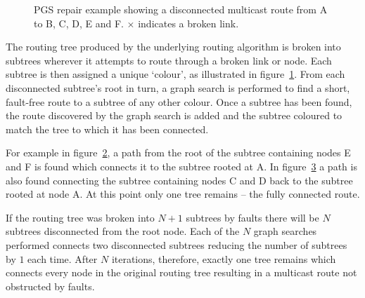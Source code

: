 		\begin{figure}
			\center
			\begin{subfigure}{0.32\linewidth}
				\hspace*{-1.5em}
				
				\caption{}
				\label{fig:pgs-repair-colouring}
			\end{subfigure}
			\begin{subfigure}{0.32\linewidth}
				\hspace*{-1.5em}
				
				\caption{}
				\label{fig:pgs-repair-colouring-fix1}
			\end{subfigure}
			\begin{subfigure}{0.32\linewidth}
				\hspace*{-1.5em}
				
				\caption{}
				\label{fig:pgs-repair-colouring-fix2}
			\end{subfigure}
			
			\caption[PGS repair example.]%
			{PGS repair example showing a disconnected multicast route from A
			to B, C, D, E and F. {\color{red}$\times$} indicates a broken link.}
			\label{fig:pgs-repair-colouring-steps}
		\end{figure}
		
		The routing tree produced by the underlying routing algorithm is broken
		into subtrees wherever it attempts to route through a broken link or node.
		Each subtree is then assigned a unique `colour', as illustrated in
		figure~\ref{fig:pgs-repair-colouring}. From each disconnected subtree's
		root in turn, a graph search is performed to find a short, fault-free route
		to a subtree of any other colour. Once a subtree has been found, the route
		discovered by the graph search is added and the subtree coloured to match
		the tree to which it has been connected.
		
		For example in figure~\ref{fig:pgs-repair-colouring-fix1}, a path from the
		root of the subtree containing nodes E and F is found which connects it to
		the subtree rooted at A. In figure~\ref{fig:pgs-repair-colouring-fix2} a
		path is also found connecting the subtree containing nodes C and D back to
		the subtree rooted at node A. At this point only one tree remains -- the
		fully connected route.
		
		If the routing tree was broken into $N+1$ subtrees by faults there will be
		$N$ subtrees disconnected from the root node. Each of the $N$ graph
		searches performed connects two disconnected subtrees reducing the number
		of subtrees by $1$ each time. After $N$ iterations, therefore, exactly one
		tree remains which connects every node in the original routing tree
		resulting in a multicast route not obstructed by faults.
		
